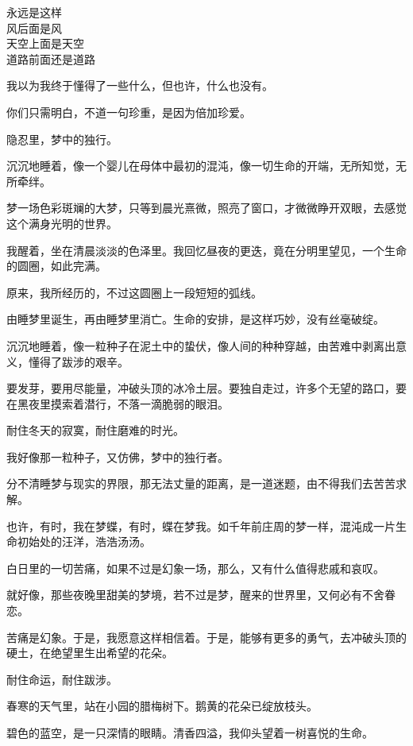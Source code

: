 \documentclass[12pt,a4paper]{article}
\def\blankrev{\vspace{1ex}}									%
\begin{document}
		\longpoem{}{}{}
		永远是这样 \\
		风后面是风 \\
		天空上面是天空 \\
		道路前面还是道路
		\endlongpoem

		我以为我终于懂得了一些什么，但也许，什么也没有。\par
		你们只需明白，不道一句珍重，是因为倍加珍爱。

	\endwriting



		隐忍里，梦中的独行。

		\blankrev
		沉沉地睡着，像一个婴儿在母体中最初的混沌，像一切生命的开端，无所知觉，无所牵绊。\par
		梦一场色彩斑斓的大梦，只等到晨光熹微，照亮了窗口，才微微睁开双眼，去感觉这个满身光明的世界。\par
		我醒着，坐在清晨淡淡的色泽里。我回忆昼夜的更迭，竟在分明里望见，一个生命的圆圈，如此完满。\par
		原来，我所经历的，不过这圆圈上一段短短的弧线。\par
		由睡梦里诞生，再由睡梦里消亡。生命的安排，是这样巧妙，没有丝毫破绽。\par
		沉沉地睡着，像一粒种子在泥土中的蛰伏，像人间的种种穿越，由苦难中剥离出意义，懂得了跋涉的艰辛。\par
		要发芽，要用尽能量，冲破头顶的冰冷土层。要独自走过，许多个无望的路口，要在黑夜里摸索着潜行，不落一滴脆弱的眼泪。\par
		耐住冬天的寂寞，耐住磨难的时光。\par
		我好像那一粒种子，又仿佛，梦中的独行者。\par
		分不清睡梦与现实的界限，那无法丈量的距离，是一道迷题，由不得我们去苦苦求解。\par
		也许，有时，我在梦蝶，有时，蝶在梦我。如千年前庄周的梦一样，混沌成一片生命初始处的汪洋，浩浩汤汤。\par
		白日里的一切苦痛，如果不过是幻象一场，那么，又有什么值得悲戚和哀叹。\par
		就好像，那些夜晚里甜美的梦境，若不过是梦，醒来的世界里，又何必有不舍眷恋。\par
		苦痛是幻象。于是，我愿意这样相信着。于是，能够有更多的勇气，去冲破头顶的硬土，在绝望里生出希望的花朵。\par
		耐住命运，耐住跋涉。\par
		春寒的天气里，站在小园的腊梅树下。鹅黄的花朵已绽放枝头。\par
		碧色的蓝空，是一只深情的眼睛。清香四溢，我仰头望着一树喜悦的生命。\par
\end{document}
